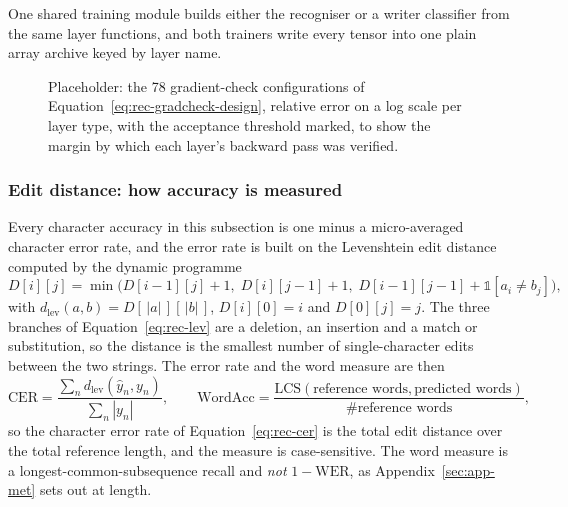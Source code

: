 One shared training module builds either the recogniser or a writer classifier from the same layer functions, and both trainers write every tensor into one plain array archive keyed by layer name.

\begin{figure}[htb]
\centering
{}
\captionsetup{singlelinecheck=false,justification=justified}
\caption{Placeholder: the 78 gradient-check configurations of Equation~\ref{eq:rec-gradcheck-design}, relative error on a log scale per layer type, with the acceptance threshold marked, to show the margin by which each layer's backward pass was verified.}
\label{fig:rec-gradcheck-fig}
\end{figure}

\subsubsection{Edit distance: how accuracy is measured}
\label{sec:rec-metric}

Every character accuracy in this subsection is one minus a micro-averaged character error rate, and the error rate is built on the Levenshtein edit distance computed by the dynamic programme
\begin{equation}
D[i][j]=\min\bigl(D[i-1][j]+1,\;D[i][j-1]+1,\;D[i-1][j-1]+\mathbb 1[a_i\ne b_j]\bigr),\label{eq:rec-lev}
\end{equation}
with $d_{\mathrm{lev}}(a,b)=D[\,\lvert a\rvert\,][\,\lvert b\rvert\,]$, $D[i][0]=i$ and $D[0][j]=j$. The three branches of Equation~\ref{eq:rec-lev} are a deletion, an insertion and a match or substitution, so the distance is the smallest number of single-character edits between the two strings. The error rate and the word measure are then
\begin{equation}
\mathrm{CER}=\frac{\sum_nd_{\mathrm{lev}}(\hat y_n,y_n)}{\sum_n|y_n|},\qquad
\mathrm{WordAcc}=\frac{\mathrm{LCS}(\text{reference words},\text{predicted words})}{\#\text{reference words}},\label{eq:rec-cer}
\end{equation}
so the character error rate of Equation~\ref{eq:rec-cer} is the total edit distance over the total reference length, and the measure is case-sensitive. The word measure is a longest-common-subsequence recall and \emph{not} $1-\mathrm{WER}$, as Appendix~\ref{sec:app-met} sets out at length.

